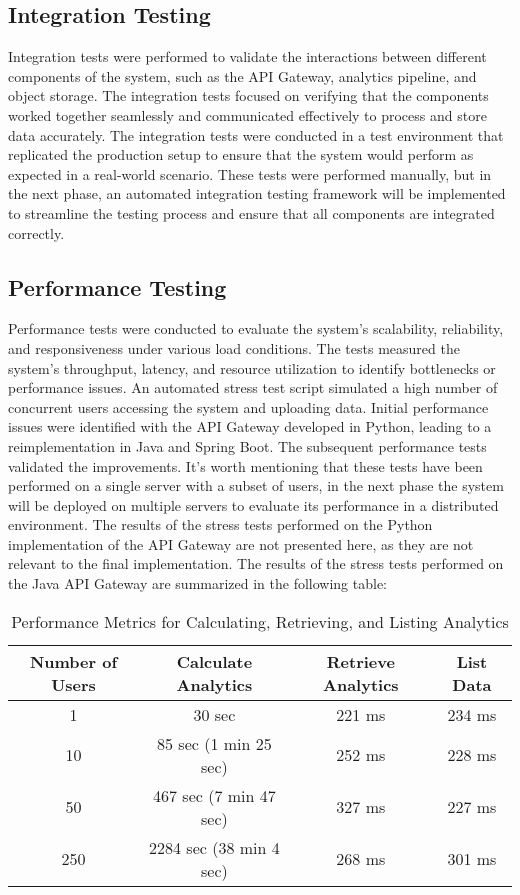 \subsection{Integration Testing}
Integration tests were performed to validate the interactions between different components of the system, such as the API Gateway, analytics pipeline, and object storage. The integration tests focused on verifying that the components worked together seamlessly and communicated effectively to process and store data accurately. The integration tests were conducted in a test environment that replicated the production setup to ensure that the system would perform as expected in a real-world scenario.
These tests were performed manually, but in the next phase, an automated integration testing framework will be implemented to streamline the testing process and ensure that all components are integrated correctly.

\subsection{Performance Testing}
Performance tests were conducted to evaluate the system's scalability, reliability, and responsiveness under various load conditions. The tests measured the system's throughput, latency, and resource utilization to identify bottlenecks or performance issues. An automated stress test script simulated a high number of concurrent users accessing the system and uploading data. Initial performance issues were identified with the API Gateway developed in Python, leading to a reimplementation in Java and Spring Boot. The subsequent performance tests validated the improvements.
It's worth mentioning that these tests have been performed on a single server with a subset of users, in the next phase the system will be deployed on multiple servers to evaluate its performance in a distributed environment.
\newline
The results of the stress tests performed on the Python implementation of the API Gateway are not presented here, as they are not relevant to the final implementation. The results of the stress tests performed on the Java API Gateway are summarized in the following table:

\begin{table}[htbp]
\centering
\begin{tabular}{|c|c|c|c|}
\hline
\textbf{Number of Users} & \textbf{Calculate Analytics} & \textbf{Retrieve Analytics} & \textbf{List Data} \\
\hline 1 & 30 sec & 221 ms & 234 ms \\
\hline 10 & 85 sec (1 min 25 sec) & 252 ms & 228 ms \\
\hline 50 & 467 sec (7 min 47 sec) & 327 ms & 227 ms \\
\hline 250 & 2284 sec (38 min 4 sec) & 268 ms & 301 ms \\
\hline
\end{tabular}
\caption{Performance Metrics for Calculating, Retrieving, and Listing Analytics}
\label{table}
\end{table}

